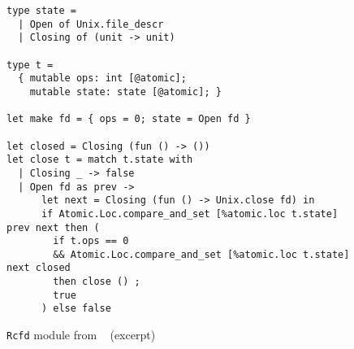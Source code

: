 \begin{figure}[t!]
\begin{verbatim}
type state =
  | Open of Unix.file_descr
  | Closing of (unit -> unit)

type t =
  { mutable ops: int [@atomic];
    mutable state: state [@atomic]; }

let make fd = { ops = 0; state = Open fd }

let closed = Closing (fun () -> ())
let close t = match t.state with
  | Closing _ -> false
  | Open fd as prev ->
      let next = Closing (fun () -> Unix.close fd) in
      if Atomic.Loc.compare_and_set [%atomic.loc t.state] prev next then (
        if t.ops == 0
        && Atomic.Loc.compare_and_set [%atomic.loc t.state] next closed
        then close () ;
        true
      ) else false
\end{verbatim}
\caption{\texttt{Rcfd} module from \Eio~\cite{eio} (excerpt)}
\label{fig:rcfd}
\end{figure}
